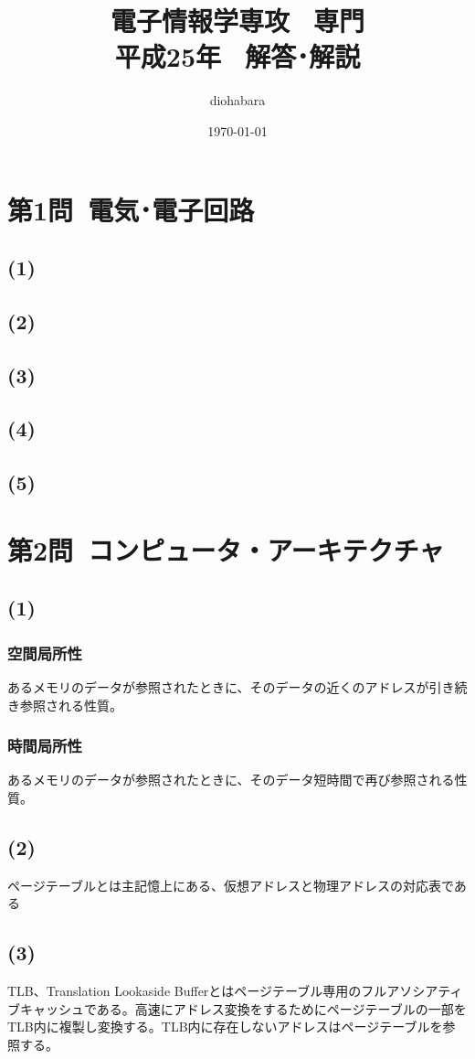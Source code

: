 \documentclass[a4paper,12pt,xelatex,ja=standard]{bxjsarticle}
\title{電子情報学専攻 \, 専門 \\ 平成25年 \, 解答･解説}
\author{diohabara}
\date{\today}
\begin{document}
\maketitle

\section*{第1問\ 電気･電子回路}
  \subsection*{(1)}
  \subsection*{(2)}
  \subsection*{(3)}
  \subsection*{(4)}
  \subsection*{(5)}

\section*{第2問\ コンピュータ・アーキテクチャ}
  \subsection*{(1)}
    \subsubsection*{空間局所性}
    あるメモリのデータが参照されたときに、そのデータの近くのアドレスが引き続き参照される性質。
    \subsubsection*{時間局所性}
    あるメモリのデータが参照されたときに、そのデータ短時間で再び参照される性質。
  \subsection*{(2)}
  ページテーブルとは主記憶上にある、仮想アドレスと物理アドレスの対応表である
  \subsection*{(3)}
  TLB、Translation Lookaside Bufferとはページテーブル専用のフルアソシアティブキャッシュである。高速にアドレス変換をするためにページテーブルの一部をTLB内に複製し変換する。TLB内に存在しないアドレスはページテーブルを参照する。
\end{document}
